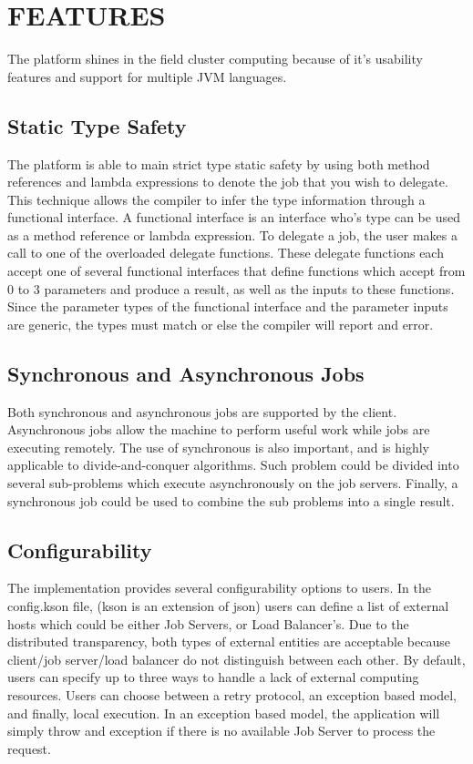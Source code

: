 \section{FEATURES}\label{sec:features}

The platform shines in the field cluster computing because of it's
usability features and support for multiple JVM languages.

\subsection{Static Type Safety}\label{subsec:typeSafety}

The platform is able to main strict type static safety by using
both method references and lambda expressions to denote
the job that you wish to delegate.
This technique allows the compiler to infer the type
information through a functional interface.
A functional interface is an interface who's type
can be used as a method reference or lambda expression.
To delegate a job, the user makes a call to one of the overloaded
delegate functions.
These delegate functions each accept one of several functional
interfaces that define functions which accept from 0 to 3 parameters
and produce a result, as well as the inputs to these functions.
Since the parameter types of the functional interface and the parameter inputs
are generic, the types must match or else the compiler will report
and error.


\subsection{Synchronous and Asynchronous Jobs}\label{subsec:synchronousAndAsynchronousJobs}

Both synchronous and asynchronous jobs are supported by the client.
Asynchronous jobs allow the machine to perform useful work
while jobs are executing remotely.
The use of synchronous is also important, and is highly applicable
to divide-and-conquer algorithms.
Such problem could be divided into several sub-problems which
execute asynchronously on the job servers.
Finally, a synchronous job could be used to combine the sub problems
into a single result.


\subsection{Configurability}\label{subsec:configurability}

The implementation provides several configurability options to users.
In the config.kson file, (kson is an extension of json) users can
define a list of external hosts which could be either Job Servers,
or Load Balancer's.
Due to the distributed transparency, both types of external entities
are acceptable because client/job server/load balancer do
not distinguish between each other.
By default, users can specify up to three ways to handle
a lack of external computing resources.
Users can choose between a retry protocol, an exception based model,
and finally, local execution.
In an exception based model, the application will simply throw
and exception if there is no available Job Server
to process the request.

